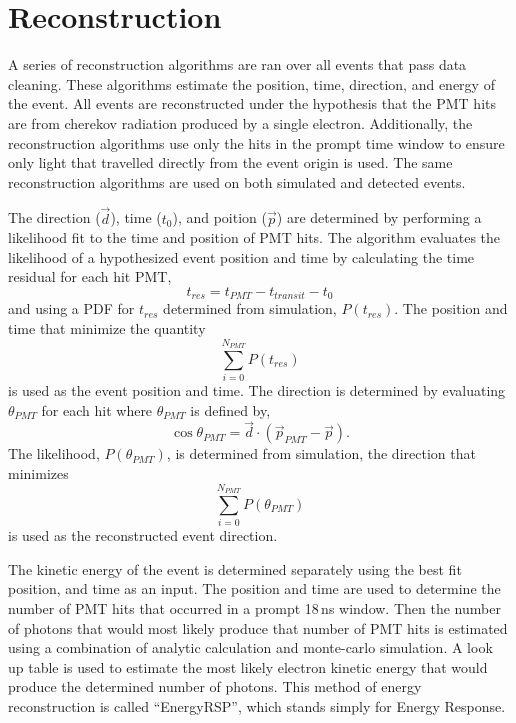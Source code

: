 \section{Reconstruction}
A series of reconstruction algorithms are ran over all events that pass data cleaning.
These algorithms estimate the position, time, direction, and energy of the event.
All events are reconstructed under the hypothesis that the PMT hits are from cherekov radiation
produced by a single electron.
Additionally, the reconstruction algorithms use only the hits in the prompt time window to ensure only light
that travelled directly from the event origin is used.
The same reconstruction algorithms are used on both simulated and detected events.

The direction ($\vec{d}$), time ($t_{0}$), and poition ($\vec{p}$) are determined by performing a likelihood
fit to the time and position of PMT hits.
The algorithm evaluates the likelihood of a hypothesized event position and time by
calculating the time residual for each hit PMT,
\begin{equation}
    \label{eqn:tres}
t_{res} = t_{PMT} - t_{transit} - t_{0}
\end{equation}
and using a PDF for $t_{res}$ determined from simulation, $P(t_{res})$.
The position and time that minimize the quantity
\begin{equation}
\sum_{i=0}^{N_{PMT}} P(t_{res}) %
\end{equation}
is used as the event position and time.
The direction is determined by evaluating $\theta_{PMT}$ for each hit where
$\theta_{PMT}$ is defined by,
\begin{equation}
    \cos\theta_{PMT} = \vec{d}\cdot\left(\vec{p}_{PMT} - \vec{p}\right)\text{.}
\end{equation}
The likelihood, $P(\theta_{PMT})$, is determined from simulation, the direction
that minimizes
\begin{equation}
\sum_{i=0}^{N_{PMT}} P(\theta_{PMT})
\end{equation}
is used as the reconstructed event direction.

The kinetic energy of the event is determined separately
using the best fit position, and time as an input.
The position and time are used to determine the number of PMT
hits that occurred in a prompt 18\,ns window.
Then the number of photons that would most likely produce
that number of PMT hits is estimated using a combination of
analytic calculation and monte-carlo simulation.
A look up table is used to estimate the most likely electron
kinetic energy that would produce the determined number of photons.
This method of energy reconstruction is called ``EnergyRSP'', which stands
simply for Energy Response.

